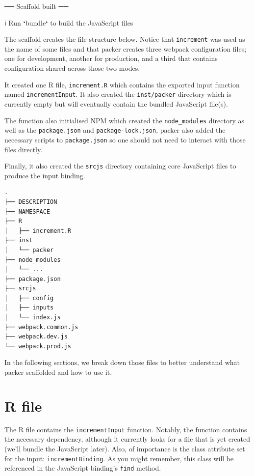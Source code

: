 \documentclass[10pt,]{krantz}
\makeatletter
\newenvironment{Shaded}{\begin{snugshade}}{\end{snugshade}}
\newcommand{\ExtensionTok}[1]{#1}
\newcommand{\KeywordTok}[1]{\textcolor[rgb]{0.27,0.27,0.27}{\textbf{#1}}}
\newcommand{\NormalTok}[1]{#1}
\newenvironment{kframe}{%
\medskip{}
\setlength{\fboxsep}{.8em}
 \def\at@end@of@kframe{}%
 \ifinner\ifhmode%
  \def\at@end@of@kframe{\end{minipage}}%
  \begin{minipage}{\columnwidth}%
 \fi\fi%
 \def\FrameCommand##1{\hskip\@totalleftmargin \hskip-\fboxsep
 \colorbox{shadecolor}{##1}\hskip-\fboxsep
     \hskip-\linewidth \hskip-\@totalleftmargin \hskip\columnwidth}%
 \MakeFramed {\advance\hsize-\width
   \@totalleftmargin\z@ \linewidth\hsize
   \@setminipage}}%
 {\par\unskip\endMakeFramed%
 \at@end@of@kframe}
\renewenvironment{Shaded}{\begin{kframe}}{\end{kframe}}
\makeatother
\begin{document}
\begin{Shaded}
\begin{Highlighting}[]
\NormalTok{── }\ExtensionTok{Scaffold}\NormalTok{ built ──}

\NormalTok{ℹ }\ExtensionTok{Run} \KeywordTok{`}\ExtensionTok{bundle}\KeywordTok{`}\NormalTok{ to build the JavaScript files}
\end{Highlighting}
\end{Shaded}

The scaffold creates the file structure below. Notice that \texttt{increment} was used as the name of some files and that packer creates three webpack configuration files; one for development, another for production, and a third that contains configuration shared across those two modes.

It created one R file, \texttt{increment.R} which contains the exported input function named \texttt{incrementInput}. It also created the \texttt{inst/packer} directory which is currently empty but will eventually contain the bundled JavaScript file(s).

The function also initialised NPM which created the \texttt{node\_modules} directory as well as the \texttt{package.json} and \texttt{package-lock.json}, packer also added the necessary scripts to \texttt{package.json} so one should not need to interact with those files directly.

Finally, it also created the \texttt{srcjs} directory containing core JavaScript files to produce the input binding.

\begin{verbatim}
.
├── DESCRIPTION
├── NAMESPACE
├── R
│   ├── increment.R
├── inst
│   └── packer
├── node_modules
│   └── ...
├── package.json
├── srcjs
│   ├── config
│   ├── inputs
│   └── index.js
├── webpack.common.js
├── webpack.dev.js
└── webpack.prod.js
\end{verbatim}

In the following sections, we break down those files to better understand what packer scaffolded and how to use it.

\hypertarget{packer-r-file}{%
\section{R file}\label{packer-r-file}}

The R file contains the \texttt{incrementInput} function. Notably, the function contains the necessary dependency, although it currently looks for a file that is yet created (we'll bundle the JavaScript later). Also, of importance is the class attribute set for the input: \texttt{incrementBinding}. As you might remember, this class will be referenced in the JavaScript binding's \texttt{find} method.
\end{document}

